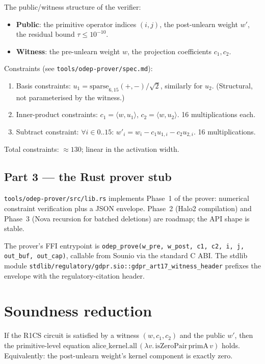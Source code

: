 \documentclass{article}
\begin{document}
The public/witness structure of the verifier:

\begin{itemize}
\item \textbf{Public}: the primitive operator indices $(i, j)$, the
      post-unlearn weight $w'$, the residual bound $\tau \le 10^{-10}$.
\item \textbf{Witness}: the pre-unlearn weight $w$, the projection
      coefficients $c_1, c_2$.
\end{itemize}

Constraints (see \texttt{tools/odep-prover/spec.md}):

\begin{enumerate}
\item Basis constraints:
  $u_1 = \mathrm{sparse}_{6,15}(+,-)/\sqrt{2}$, similarly for $u_2$.
  (Structural, not parameterised by the witness.)
\item Inner-product constraints:
  $c_1 = \langle w, u_1\rangle$, $c_2 = \langle w, u_2\rangle$.
  16 multiplications each.
\item Subtract constraint:
  $\forall i\in 0..15$: $w'_i = w_i - c_1 u_{1,i} - c_2 u_{2,i}$.
  16 multiplications.
\end{enumerate}

Total constraints: $\approx 130$; linear in the activation width.

\subsection{Part 3 --- the Rust prover stub}

\texttt{tools/odep-prover/src/lib.rs} implements Phase~1 of the
prover: numerical constraint verification plus a JSON envelope.
Phase~2 (Halo2 compilation) and Phase~3 (Nova recursion for batched
deletions) are roadmap; the API shape is stable.

The prover's FFI entrypoint is
\texttt{odep\_prove(w\_pre, w\_post, c1, c2, i, j, out\_buf, out\_cap)},
callable from Sounio via the standard C ABI.  The stdlib module
\texttt{stdlib/regulatory/gdpr.sio::gdpr\_art17\_witness\_header}
prefixes the envelope with the regulatory-citation header.

\section{Soundness reduction}

\begin{theorem}
If the R1CS circuit is satisfied by a witness $(w, c_1, c_2)$ and the
public $w'$, then the primitive-level equation
$\mathrm{alice\_kernel}.\mathrm{all}\,(\lambda v.\,\mathrm{isZeroPair}\,\mathrm{primA}\,v)$
holds.  Equivalently: the post-unlearn weight's kernel component is
exactly zero.
\end{theorem}
\end{document}

